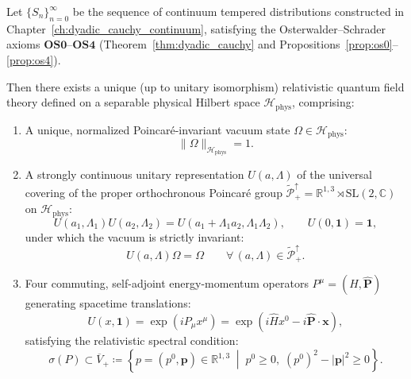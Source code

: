 \begin{theorem}
\label{thm:os_reconstruction_general}
Let $\{S_n\}_{n=0}^\infty$ be the sequence of continuum tempered distributions constructed in Chapter~\ref{ch:dyadic_cauchy_continuum}, satisfying the Osterwalder--Schrader axioms $\mathbf{OS0}$--$\mathbf{OS4}$ (Theorem~\ref{thm:dyadic_cauchy} and Propositions~\ref{prop:os0}--\ref{prop:os4}).

Then there exists a unique (up to unitary isomorphism) relativistic quantum field theory defined on a separable physical Hilbert space $\mathcal{H}_{\mathrm{phys}}$, comprising:
\begin{enumerate}[label=\textup{(\arabic*)}]
    \item A unique, normalized Poincar\'e-invariant vacuum state $\Omega \in \mathcal{H}_{\mathrm{phys}}$:
    \begin{equation}
    \label{eq:vacuum_normalized_unit}
    \|\Omega\|_{\mathcal{H}_{\mathrm{phys}}} = 1.
    \end{equation}

    \item A strongly continuous unitary representation $U(a, \Lambda)$ of the universal covering of the proper orthochronous Poincar\'e group $\widetilde{\mathcal{P}}_+^\uparrow = \mathbb{R}^{1,3} \rtimes \mathrm{SL}(2, \mathbb{C})$ on $\mathcal{H}_{\mathrm{phys}}$:
    \begin{equation}
    U(a_1, \Lambda_1) U(a_2, \Lambda_2) = U(a_1 + \Lambda_1 a_2, \Lambda_1 \Lambda_2), \qquad U(0, \mathbf{1}) = \mathbf{1},
    \end{equation}
    under which the vacuum is strictly invariant:
    \begin{equation}
    U(a, \Lambda) \Omega = \Omega \qquad \forall \, (a, \Lambda) \in \widetilde{\mathcal{P}}_+^\uparrow.
    \end{equation}

    \item Four commuting, self-adjoint energy-momentum operators $P^\mu = (\hat{H}, \hat{\mathbf{P}})$ generating spacetime translations:
    \begin{equation}
    \label{eq:poincare_translation_generator}
    U(x, \mathbf{1}) = \exp(i P_\mu x^\mu) = \exp(i \hat{H} x^0 - i \hat{\mathbf{P}} \cdot \mathbf{x}),
    \end{equation}
    satisfying the relativistic spectral condition:
    \begin{equation}
    \label{eq:relativistic_spectral_condition}
    \sigma(P) \subset \overline{V}_+ \coloneqq \left\{ p = (p^0, \mathbf{p}) \in \mathbb{R}^{1,3} \;\middle|\; p^0 \ge 0, \; (p^0)^2 - |\mathbf{p}|^2 \ge 0 \right\}.
    \end{equation}


\end{enumerate}
\end{theorem}
